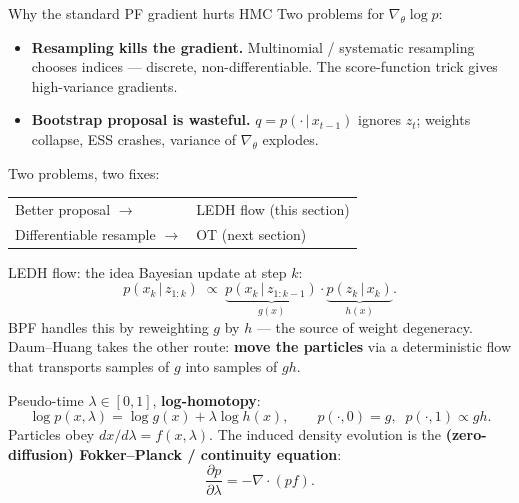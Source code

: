 \documentclass[10pt,aspectratio=169]{beamer}
\newcommand{\given}{\,|\,}
\begin{document}
\begin{frame}{Why the standard PF gradient hurts HMC}
  Two problems for $\nabla_\theta \log p$:
  \begin{itemize}
    \item \textbf{Resampling kills the gradient.} Multinomial / systematic resampling chooses indices --- discrete, non-differentiable. The score-function trick gives high-variance gradients.
    \item \textbf{Bootstrap proposal is wasteful.} $q = p(\cdot\given x_{t-1})$ ignores $z_t$; weights collapse, ESS crashes, variance of $\nabla_\theta$ explodes.
  \end{itemize}

  \medskip
  Two problems, two fixes:
  \begin{center}
  \begin{tabular}{ll}
    \toprule
    Better proposal $\rightarrow$ & LEDH flow (this section) \\
    Differentiable resample $\rightarrow$ & OT (next section) \\
    \bottomrule
  \end{tabular}
  \end{center}
\end{frame}

\begin{frame}{LEDH flow: the idea}
  Bayesian update at step $k$:
  \[
    p(x_k \given z_{1:k}) \;\propto\; \underbrace{p(x_k \given z_{1:k-1})}_{g(x)} \cdot \underbrace{p(z_k \given x_k)}_{h(x)}.
  \]
  BPF handles this by reweighting $g$ by $h$ --- the source of weight degeneracy. Daum--Huang takes the other route: \textbf{move the particles} via a deterministic flow that transports samples of $g$ into samples of $g h$.

  \medskip
  Pseudo-time $\lambda \in [0,1]$, \textbf{log-homotopy}:
  \[
    \log p(x, \lambda) = \log g(x) + \lambda \log h(x), \qquad p(\cdot, 0) = g, \;\; p(\cdot, 1) \propto g h.
  \]
  Particles obey $dx/d\lambda = f(x, \lambda)$. The induced density evolution is the \textbf{(zero-diffusion) Fokker--Planck / continuity equation}:
  \[
    \frac{\partial p}{\partial \lambda} = -\nabla \cdot (p f).
  \]
\end{frame}
\end{document}
